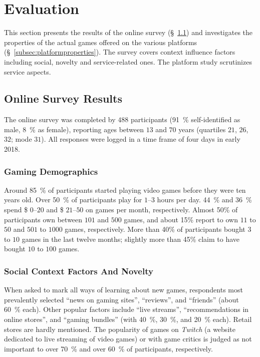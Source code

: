 \section{Evaluation}
\label{sec:eval}

This section presents the results of the online survey
(\S~\ref{subsec:survey}) and
investigates the properties of the actual games offered on the
various platforms (\S~\ref{subsec:platformproperties}).
The survey covers context influence factors including social,
novelty and service-related ones. The platform study scrutinizes
service aspects.

\subsection{Online Survey Results}\label{subsec:survey}
The online survey was completed by $488$ participants
(\SI{91}{\percent} self-identified as male, \SI{8}{\percent} as female), reporting
ages between $13$ and $70$ years (quartiles $21$, $26$, $32$; mode $31$).
All responses were logged in a time frame of four days in early 2018.

\subsubsection{Gaming Demographics}
Around \SI{85}{\percent} of
participants started playing video games before they were ten years old.
Over \SI{50}{\percent} of participants play for $1$--$3$ hours per day.
\SI{44}{\percent} and \SI{36}{\percent} spend \$ $0$--$20$ and \$ $21$--$50$ on games per month, respectively.
Almost 50\% of participants own between $101$ and $500$ games, and about
15\% report to own $11$ to $50$ and $501$ to $1000$ games, respectively.
More than 40\% of participants bought $3$ to $10$ games in the last
twelve months; slightly more than 45\% claim to have bought
$10$ to $100$ games.



\subsubsection{Social Context Factors And Novelty}

When asked to mark all ways of learning about new games, respondents
most prevalently selected ``news on gaming sites'', ``reviews'', and
``friends'' (about \SI{60}{\percent} each). Other popular factors include
``live streams'', ``recommendations in online stores'', and
``gaming bundles'' (with \SI{40}{\percent}, \SI{30}{\percent}, and \SI{20}{\percent} each). Retail stores are hardly mentioned.
The popularity of games on \textit{Twitch} (a website dedicated to
live streaming of video games) or with game critics is judged as not
important to over \SI{70}{\percent} and over \SI{60}{\percent} of participants, respectively.

